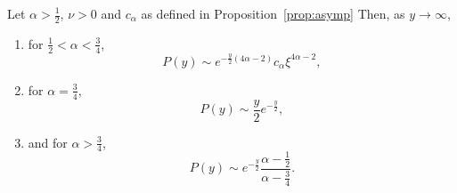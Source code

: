 
\begin{proposition}\label{prop:asymptotics_P}
Let $\alpha > \frac{1}{2}$, $\nu > 0$ and $c_\alpha$ as defined in Proposition~\ref{prop:asymp} Then, as $y \to \infty$, 
\begin{enumerate}
\item for $\frac{1}{2} < \alpha < \frac{3}{4}$,
\[
	P(y) \sim e^{-\frac{y}{2}(4\alpha - 2)} c_\alpha \xi^{4\alpha - 2},
\]
\item for $\alpha = \frac{3}{4}$,
\[
	P(y) \sim \frac{y}{2} e^{-\frac{y}{2}},
\]
\item and for $\alpha > \frac{3}{4}$,
\[
	P(y) \sim e^{-\frac{y}{2}} \frac{\alpha - \frac{1}{2}}{\alpha - \frac{3}{4}}.
\]
\end{enumerate}
\end{proposition}

